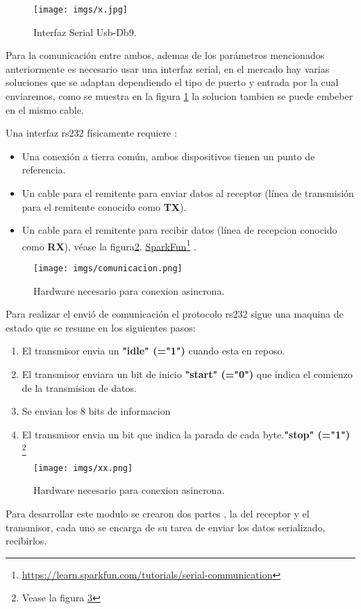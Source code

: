 \documentclass[paper=a4, fontsize=12pt]{article} 		%
\newcommand\fnurl[2]{%
\href{#2}{#1}\footnote{\url{#2}}%
}
\numberwithin{equation}{section}						%
\numberwithin{table}{section} 							%
\begin{document}
\begin{figure}[H]
  \centering
     \texttt{[image: imgs/x.jpg]}
  \caption{Interfaz Serial Usb-Db9.}
    \label{fig:rsserial}
\end{figure}

Para la comunicación entre ambos, ademas de los parámetros mencionados anteriormente es necesario usar una interfaz serial, en el mercado hay varias soluciones que se adaptan dependiendo el tipo de puerto y entrada por la cual enviaremos, como se muestra en la figura \ref{fig:rsserial}  la solucion tambien se puede embeber en el mismo cable.

Una interfaz rs232 físicamente requiere :
\begin{itemize}
\item Una conexión a tierra común, ambos dispositivos tienen un punto de referencia.
\item Un cable para el remitente para enviar datos al receptor (línea de transmisión para el remitente conocido como \textbf{TX}).
\item Un cable para el remitente para recibir datos  (línea de recepcion conocido como \textbf{RX}), véase la figura\ref{fig:hard}. \fnurl{SparkFun}{https://learn.sparkfun.com/tutorials/serial-communication}.
\end{itemize}
\begin{figure}[H]
  \centering
     \texttt{[image: imgs/comunicacion.png]}
  \caption{Hardware necesario para conexion asincrona.}
    \label{fig:hard}
\end{figure}

Para realizar el envió de comunicación el protocolo rs232 sigue una maquina de estado que se resume en los siguientes pasos:
\begin{enumerate}
\item El transmisor envia un \textbf{"idle" (="1")}  cuando esta en reposo.
\item El transmisor enviara un bit de inicio \textbf{"start" (="0")} que indica el comienzo de la transmision de datos.
\item Se envian los 8 bits de informacion
\item El transmisor envia un bit que indica la parada de cada byte.\textbf{"stop" (="1")} \footnote{Vease la figura \ref{fig:senal}}
\end{enumerate}

\begin{figure}[H]
  \centering
     \texttt{[image: imgs/xx.png]}
  \caption{Hardware necesario para conexion asincrona.}
    \label{fig:senal}
\end{figure}
Para desarrollar este modulo se crearon dos partes , la del receptor y el transmisor, cada uno se encarga de su tarea de enviar los datos serializado, recibirlos. 
\end{document}
